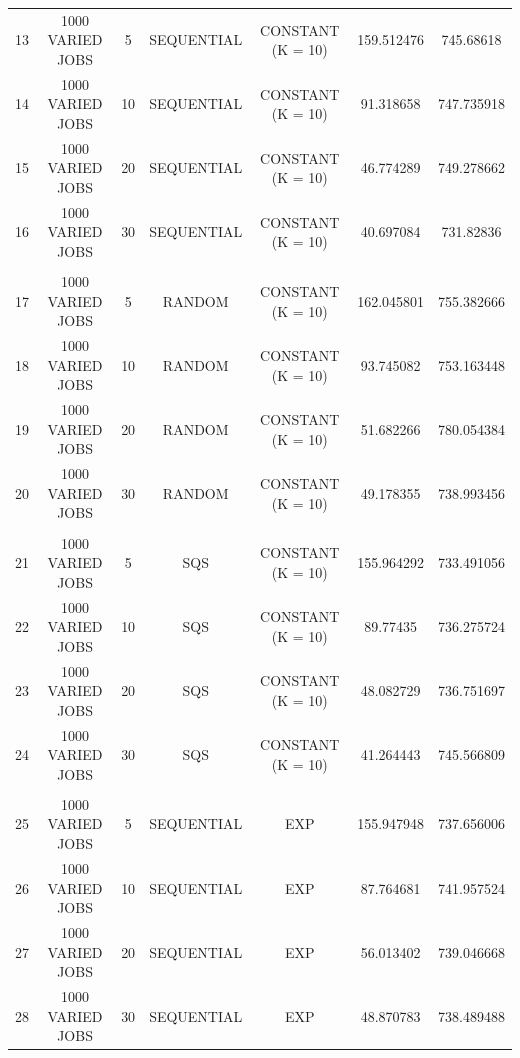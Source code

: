 \documentclass{article}
\begin{document}
\begin{table}
\begin{tabular}{|c | c | c | c | c | c | c |}
   &                  &    &            &                   &            &            \\ \hline
13 & 1000 VARIED JOBS & 5  & SEQUENTIAL & CONSTANT (K = 10) & 159.512476 & 745.68618  \\ \hline
14 & 1000 VARIED JOBS & 10 & SEQUENTIAL & CONSTANT (K = 10) & 91.318658  & 747.735918 \\ \hline
15 & 1000 VARIED JOBS & 20 & SEQUENTIAL & CONSTANT (K = 10) & 46.774289  & 749.278662 \\ \hline
16 & 1000 VARIED JOBS & 30 & SEQUENTIAL & CONSTANT (K = 10) & 40.697084  & 731.82836  \\ \hline
   &                  &    &            &                   &            &            \\ \hline
17 & 1000 VARIED JOBS & 5  & RANDOM     & CONSTANT (K = 10) & 162.045801 & 755.382666 \\ \hline
18 & 1000 VARIED JOBS & 10 & RANDOM     & CONSTANT (K = 10) & 93.745082  & 753.163448 \\ \hline
19 & 1000 VARIED JOBS & 20 & RANDOM     & CONSTANT (K = 10) & 51.682266  & 780.054384 \\ \hline
20 & 1000 VARIED JOBS & 30 & RANDOM     & CONSTANT (K = 10) & 49.178355  & 738.993456 \\ \hline
   &                  &    &            &                   &            &            \\ \hline
21 & 1000 VARIED JOBS & 5  & SQS        & CONSTANT (K = 10) & 155.964292 & 733.491056 \\ \hline
22 & 1000 VARIED JOBS & 10 & SQS        & CONSTANT (K = 10) & 89.77435   & 736.275724 \\ \hline
23 & 1000 VARIED JOBS & 20 & SQS        & CONSTANT (K = 10) & 48.082729  & 736.751697 \\ \hline
24 & 1000 VARIED JOBS & 30 & SQS        & CONSTANT (K = 10) & 41.264443  & 745.566809 \\ \hline
   &                  &    &            &                   &            &            \\ \hline
25 & 1000 VARIED JOBS & 5  & SEQUENTIAL & EXP               & 155.947948 & 737.656006 \\ \hline
26 & 1000 VARIED JOBS & 10 & SEQUENTIAL & EXP               & 87.764681  & 741.957524 \\ \hline
27 & 1000 VARIED JOBS & 20 & SEQUENTIAL & EXP               & 56.013402  & 739.046668 \\ \hline
28 & 1000 VARIED JOBS & 30 & SEQUENTIAL & EXP               & 48.870783  & 738.489488 \\ \hline

\end{tabular}
\end{table}
\end{document}
